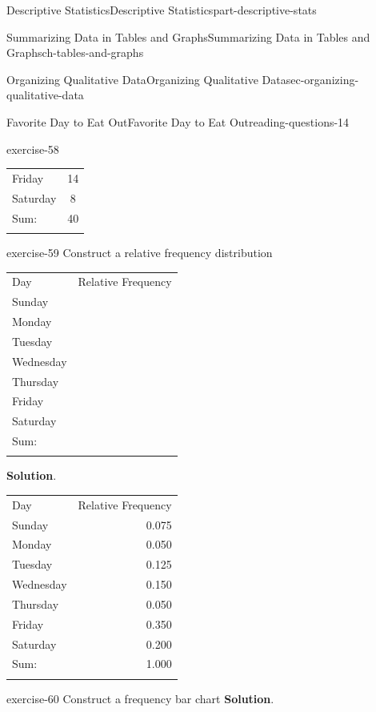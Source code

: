 \documentclass[oneside,10pt,]{book}
\numberwithin{equation}{section}
\newcommand{\hrulethin}  {\noalign{\hrule height 0.04em}}
\newcommand{\hrulethick} {\noalign{\hrule height 0.11em}}
\begin{document}
\begin{partptx}{Descriptive Statistics}{}{Descriptive Statistics}{}{}{part-descriptive-stats}
\begin{chapterptx}{Summarizing Data in Tables and Graphs}{}{Summarizing Data in Tables and Graphs}{}{}{ch-tables-and-graphs}
\begin{sectionptx}{Organizing Qualitative Data}{}{Organizing Qualitative Data}{}{}{sec-organizing-qualitative-data}
\begin{reading-questions-subsection-numberless}{Favorite Day to Eat Out}{}{Favorite Day to Eat Out}{}{}{reading-questions-14}
\begin{divisionexercise}{1}{}{}{exercise-58}
\begin{tabular}{ll}
Friday&\multicolumn{1}{c}{14}\tabularnewline\hrulethin
Saturday&\multicolumn{1}{c}{8}\tabularnewline\hrulethick
Sum:&\multicolumn{1}{c}{40}\tabularnewline\hrulethick
\end{tabular}
\end{divisionexercise}%
\begin{divisionexercise}{2}{}{}{exercise-59}%
\hypertarget{p-40}{}%
Construct a relative frequency distribution%
\begin{tabular}{ll}\hrulethick
Day&\multicolumn{1}{c}{Relative Frequency}\tabularnewline\hrulethick
Sunday&\multicolumn{1}{c}{}\tabularnewline\hrulethin
Monday&\multicolumn{1}{c}{}\tabularnewline\hrulethin
Tuesday&\multicolumn{1}{c}{}\tabularnewline\hrulethin
Wednesday&\multicolumn{1}{c}{}\tabularnewline\hrulethin
Thursday&\multicolumn{1}{c}{}\tabularnewline\hrulethin
Friday&\multicolumn{1}{c}{}\tabularnewline\hrulethin
Saturday&\multicolumn{1}{c}{}\tabularnewline\hrulethick
Sum:&\multicolumn{1}{c}{}\tabularnewline\hrulethick
\end{tabular}
\textbf{Solution}.\hypertarget{solution-4}{}\quad%
\begin{tabular}{ll}\hrulethick
Day&\multicolumn{1}{r}{Relative Frequency}\tabularnewline\hrulethick
Sunday&\multicolumn{1}{r}{0.075}\tabularnewline\hrulethin
Monday&\multicolumn{1}{r}{0.050}\tabularnewline\hrulethin
Tuesday&\multicolumn{1}{r}{0.125}\tabularnewline\hrulethin
Wednesday&\multicolumn{1}{r}{0.150}\tabularnewline\hrulethin
Thursday&\multicolumn{1}{r}{0.050}\tabularnewline\hrulethin
Friday&\multicolumn{1}{r}{0.350}\tabularnewline\hrulethin
Saturday&\multicolumn{1}{r}{0.200}\tabularnewline\hrulethick
Sum:&\multicolumn{1}{r}{1.000}\tabularnewline\hrulethick
\end{tabular}
\end{divisionexercise}%
\begin{divisionexercise}{3}{}{}{exercise-60}%
\hypertarget{p-41}{}%
Construct a frequency bar chart%
\textbf{Solution}.\hypertarget{solution-5}{}\quad%

\end{divisionexercise}
\end{reading-questions-subsection-numberless}
\end{sectionptx}
\end{chapterptx}
\end{partptx}
\end{document}
